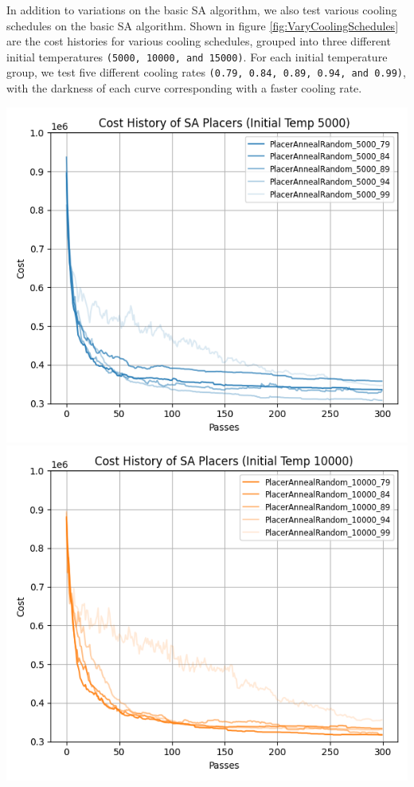 \begin{multicols}{2}
    In addition to variations on the basic SA algorithm, we also test various cooling schedules on the basic SA algorithm.
    Shown in figure \ref{fig:VaryCoolingSchedules} are the cost histories for various cooling schedules, grouped into three different initial temperatures \texttt{(5000, 10000, and 15000)}. 
    For each initial temperature group, we test five different cooling rates \texttt{(0.79, 0.84, 0.89, 0.94, and 0.99)}, with the darkness of each curve corresponding with a faster cooling rate.

\end{multicols}

{
    \centering
    \includegraphics[valign=t, scale=0.55]{figures/results/cost_history_5000.png}
    \includegraphics[valign=t, scale=0.55]{figures/results/cost_history_10000.png}
}
